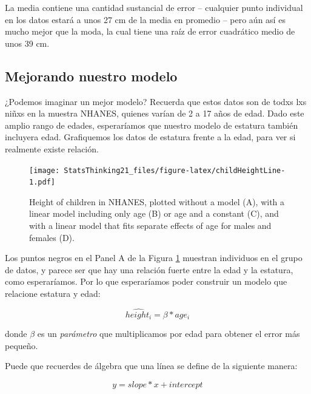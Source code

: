\documentclass[
  12pt,
]{book}
\begin{document}
La media contiene una cantidad sustancial de error -- cualquier punto individual en los datos estará a unos 27 cm de la media en promedio -- pero aún así es mucho mejor que la moda, la cual tiene una raíz de error cuadrático medio de unos 39 cm.

\hypertarget{mejorando-nuestro-modelo}{%
\subsection{Mejorando nuestro modelo}\label{mejorando-nuestro-modelo}}

¿Podemos imaginar un mejor modelo? Recuerda que estos datos son de todxs lxs niñxs en la muestra NHANES, quienes varían de 2 a 17 años de edad. Dado este amplio rango de edades, esperaríamos que nuestro modelo de estatura también incluyera edad. Grafiquemos los datos de estatura frente a la edad, para ver si realmente existe relación.

\begin{figure}
\centering
\texttt{[image: StatsThinking21\_files/figure-latex/childHeightLine-1.pdf]}
\caption{\label{fig:childHeightLine}Height of children in NHANES, plotted without a model (A), with a linear model including only age (B) or age and a constant (C), and with a linear model that fits separate effects of age for males and females (D).}
\end{figure}

Los puntos negros en el Panel A de la Figura \ref{fig:childHeightLine} muestran individuos en el grupo de datos, y parece ser que hay una relación fuerte entre la edad y la estatura, como esperaríamos. Por lo que esperaríamos poder construir un modelo que relacione estatura y edad:

\[
\hat{height_i} =  \beta * age_i
\]

donde \(\beta\) es un \emph{parámetro} que multiplicamos por edad para obtener el error más pequeño.

Puede que recuerdes de álgebra que una línea se define de la siguiente manera:

\[
y = slope*x + intercept
\]
\end{document}
